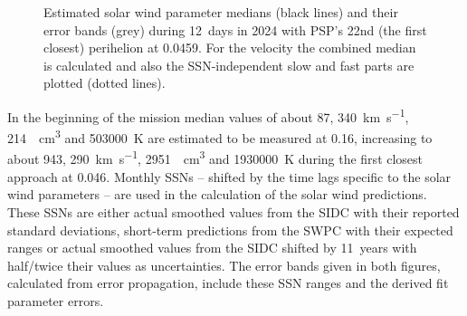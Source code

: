 \documentclass[]{aa}
\begin{document}
	\begin{figure}
		\caption{Estimated solar wind parameter medians (black lines) and their error bands (grey) during 12~days in 2024 with PSP's 22nd (the first closest) perihelion at \SI{0.0459}{\au}. For the velocity the combined median is calculated and also the SSN-independent slow and fast parts are plotted (dotted lines).}
		\label{fig:SPP_perihelia_prediction_nearest_f_plot}
	\end{figure}
	In the beginning of the mission median values of about \SI{87}{\nT}, \SI{340}{\km\per\s}, \SI{214}{\per\cm\cubed} and \SI{503000}{\K} are estimated to be measured at \SI{0.16}{\au}, increasing to about \SI{943}{\nT}, \SI{290}{\km\per\s}, \SI{2951}{\per\cm\cubed} and \SI{1930000}{\K} during the first closest approach at \SI{0.046}{\au}. Monthly SSNs -- shifted by the time lags specific to the solar wind parameters -- are used in the calculation of the solar wind predictions. These SSNs are either actual smoothed values from the SIDC with their reported standard deviations, short-term predictions from the SWPC with their expected ranges or actual smoothed values from the SIDC shifted by 11~years with half/twice their values as uncertainties. The error bands given in both figures, calculated from error propagation, include these SSN ranges and the derived fit parameter errors.
\end{document}

